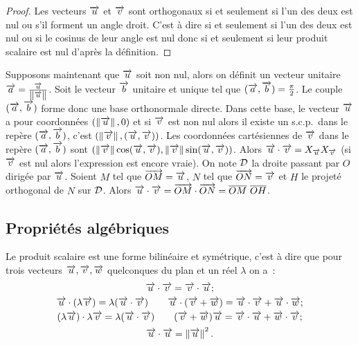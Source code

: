\begin{proof}
  Les vecteurs \(\vu\) et \(\vv\) sont orthogonaux si et seulement si l'un des
  deux est nul ou s'il forment un angle droit. C'est à dire si et seulement si
  l'un des deux est nul ou si le cosinus de leur angle est nul donc si et
  seulement si leur produit scalaire est nul d'après la définition.
\end{proof}

Supposons maintenant que \(\vu\) soit non nul, alors on définit un vecteur
unitaire \(\vect{a} = \frac{\vu}{\norme{\vu}}\). Soit le vecteur \(\vect{b}\)
unitaire et unique tel que \((\vect{a},\vect{b}) = \frac{\pi}{2}\). Le couple
\((\vect{a},\vect{b})\) forme donc une base orthonormale directe. Dans cette
base, le vecteur \(\vu\) a pour coordonnées \((\norme{\vu},0)\) et si \(\vv\)
est non nul alors il existe un s.c.p.\ dans le repère \((\vect{a},\vect{b})\),
c'est \((\norme{\vv}, (\vu , \vv))\). Les coordonnées cartésiennes de \(\vv\)
dans le repère \((\vect{a},\vect{b})\) sont \((\norme{\vv}\cos(\vu ,
\vv),\norme{\vv}\sin(\vu , \vv))\). Alors \(\vu \cdot \vv = X_{\vu}X_{\vv}\) (si
\(\vv\) est nul alors l'expression est encore vraie).  On note \(\Dr\) la droite
passant par \(O\) dirigée par \(\vu\). Soient \(M\) tel que \(\vect{OM} = \vu\),
\(N\) tel que \(\vect{ON} = \vv\) et \(H\) le projeté orthogonal de \(N\) sur
\(\Dr\). Alors \(\vu \cdot \vv = \vect{OM} \cdot \vect{ON}=
\overline{OM}~\overline{OH}\).

\subsection{Propriétés algébriques}

\begin{prop}
  Le produit scalaire est une forme bilinéaire et symétrique, c'est à dire que
  pour trois vecteurs \(\vu, \vv, \vw\) quelconques du plan et un réel
  \(\lambda\) on a~:
  \begin{gather}
    \vu \cdot \vv = \vv \cdot \vu;\\
    \vu \cdot (\lambda \vv) = \lambda (\vu\cdot \vv) \qquad \vu \cdot (\vv +
    \vw) = \vu \cdot \vv + \vu \cdot \vw;\\
    (\lambda \vu) \cdot \lambda \vv = \lambda (\vu \cdot \vv) \qquad (\vv + \vw)
    \vu = \vv \cdot \vu + \vw \cdot \vv;\\
    \vu \cdot \vu = \norme{\vu}^2.
  \end{gather}
\end{prop}

